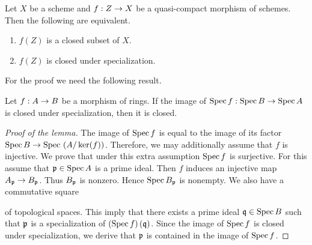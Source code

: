 \begin{theorem}\label{theorem:specializationimpliesclosed}
Let $X$ be a scheme and $f:Z\rightarrow X$ be a quasi-compact morphism of schemes. Then the following are equivalent.
\begin{enumerate}[label=\emph{\textbf{(\roman*)}}, leftmargin=*]
\item $f(Z)$ is a closed subset of $X$.
\item $f(Z)$ is closed under specialization.
\end{enumerate}
\end{theorem}
\noindent
For the proof we need the following result.
\begin{lemma}\label{lemma:specializationandaffineimages}
Let $f:A\rightarrow B$ be a morphism of rings. If the image of $\mathrm{Spec}\, f:\mathrm{Spec}\, B\rightarrow \mathrm{Spec}\, A$ is closed under specialization, then it is closed.
\end{lemma}
\begin{proof}[Proof of the lemma]
The image of $\mathrm{Spec}\, f$ is equal to the image of its factor $\mathrm{Spec}\, B\rightarrow \mathrm{Spec}\, \left(A/\ker(f)\right)$. Therefore, we may additionally assume that $f$ is injective. We prove that under this extra assumption $\mathrm{Spec}\, f$ is surjective. For this assume that $\mathfrak{p}\in \mathrm{Spec}\, A$ is a prime ideal. Then $f$ induces an injective map $A_{\mathfrak{p}}\rightarrow B_{\mathfrak{p}}$. Thus $B_{\mathfrak{p}}$ is nonzero. Hence $\mathrm{Spec}\, B_{\mathfrak{p}}$ is nonempty. We also have a commutative square
\begin{center}
\end{center} 
of topological spaces. This imply that there exists a prime ideal $\mathfrak{q}\in \mathrm{Spec}\, B$ such that $\mathfrak{p}$ is a specialization of $\left(\mathrm{Spec}\, f\right)(\mathfrak{q})$. Since the image of $\mathrm{Spec}\, f$ is closed under specialization, we derive that $\mathfrak{p}$ is contained in the image of $\mathrm{Spec}\, f$.
\end{proof}


